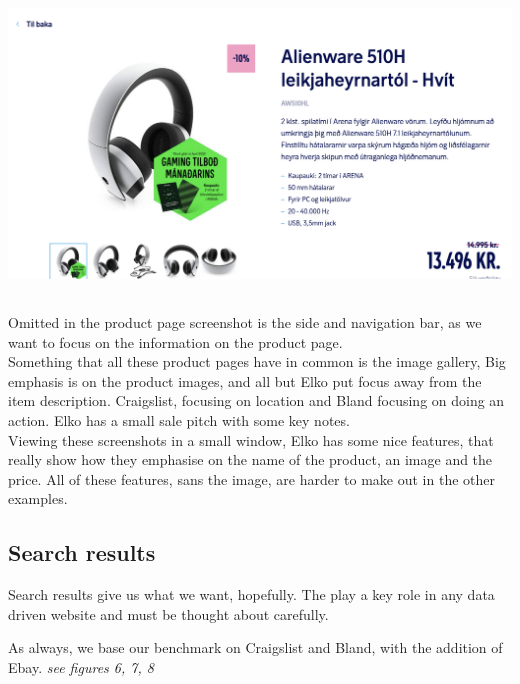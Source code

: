 \begin{Figure}
    \begin{center}
        \includegraphics[width=150mm, height=80mm]{Images/benchmarking/product_page_elko.png}
    \end{center}
\end{Figure}
Omitted in the product page screenshot is the side and navigation bar, as we want to focus on the information on the product page.\\

Something that all these product pages have in common is the image gallery, Big emphasis is on the product images, and all but Elko put focus away from the item description. Craigslist, focusing on location and Bland focusing on doing an action. Elko has a small sale pitch with some key notes.\\

Viewing these screenshots in a small window, Elko has some nice features, that really show how they emphasise on the name of the product, an image and the price. All of these features, sans the image, are harder to make out in the other examples.

\subsection{Search results}
Search results give us what we want, hopefully. The play a key role in any data driven website and must be thought about carefully. 

As always, we base our benchmark on Craigslist and Bland, with the addition of Ebay. \textit{see figures 6, 7, 8}

